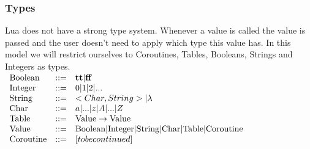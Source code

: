 \documentclass{article}
\begin{document}
\subsubsection{Types}
Lua does not have a strong type system. Whenever a value is called the value is passed and the user doesn't need to apply which type this value has. In this model we will restrict ourselves to Coroutines, Tables, Booleans, Strings and Integers as types.\\
$
\begin{array}{lcl}
\text{Boolean} &::=& \textbf{tt} | \textbf{ff}\\
\text{Integer} &::=& 0 | 1 | 2 | ...\\
\text{String} &::=& <Char,String>| \lambda \\
\text{Char} &::=& a|...|z|A|...|Z \\
\text{Table} &::=& \text{Value} \to \text{Value}\\ %
\text{Value} &::=& \text{Boolean} | \text{Integer} | \text{String} | \text{Char} | \text{Table} | \text{Coroutine} \\
\text{Coroutine} &::=& [to be continued] \\ %
\end{array}\\
$
\end{document}
